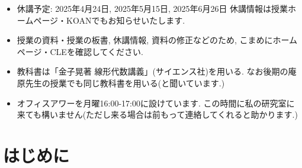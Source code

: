 \documentclass[dvipdfmx,a4paper,11pt]{article}
\theoremstyle{definition}
\begin{document}
\vspace{11pt}
\begin{itemize}
  \setlength{\parskip}{0cm} %
  \setlength{\itemsep}{0cm} %
  \item 休講予定: 2025年4月24日, 2025年5月15日, 2025年6月26日 休講情報は授業ホームページ・KOANでもお知らせいたします.
  \item 授業の資料・授業の板書, 休講情報, 資料の修正などのため, こまめにホームページ・CLEを確認してください.
  \item 教科書は「金子晃著 線形代数講義」(サイエンス社)を用いる. なお後期の庵原先生の授業でも同じ教科書を用いる(と聞いています.)
   \item オフィスアワーを月曜16:00-17:00に設けています. この時間に私の研究室に来ても構いません(ただし来る場合は前もって連絡してくれると助かります.)
 \end{itemize}
\newpage

\setcounter{section}{-1}
\section{はじめに}

\end{document}
